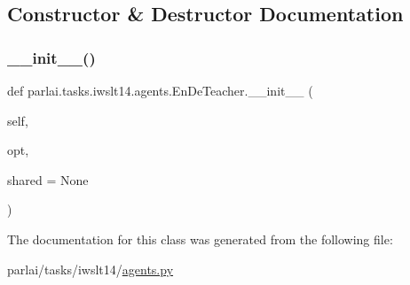 \subsection{Constructor \& Destructor Documentation}
\mbox{\label{classparlai_1_1tasks_1_1iwslt14_1_1agents_1_1EnDeTeacher_a1f914b4b0d6966897f2addccd6001acc}} 
\subsubsection{\texorpdfstring{\+\_\+\+\_\+init\+\_\+\+\_\+()}{\_\_init\_\_()}}
{\footnotesize\ttfamily def parlai.\+tasks.\+iwslt14.\+agents.\+En\+De\+Teacher.\+\_\+\+\_\+init\+\_\+\+\_\+ (\begin{DoxyParamCaption}\item[{}]{self,  }\item[{}]{opt,  }\item[{}]{shared = {\ttfamily None} }\end{DoxyParamCaption})}



The documentation for this class was generated from the following file\+:\begin{DoxyCompactItemize}
\item 
parlai/tasks/iwslt14/\hyperlink{parlai_2tasks_2iwslt14_2agents_8py}{agents.\+py}\end{DoxyCompactItemize}
